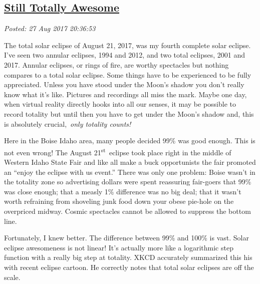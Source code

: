 %

\subsection*{\href{http://analyzethedatanotthedrivel.org/2017/08/27/still-totally-awesome/}{Still Totally Awesome}}


\noindent\emph{Posted: 27 Aug 2017 20:36:53}
\vspace{6pt}

The total solar eclipse of August 21, 2017, was my fourth complete solar
eclipse. I've seen two annular eclipses, 1994 and 2012, and two total
eclipses, 2001 and 2017. Annular eclipses, or rings of fire, are worthy
spectacles but nothing compares to a total solar eclipse. Some things
have to be experienced to be fully appreciated. Unless you have stood
under the Moon's shadow you don't really know what it's like. Pictures
and recordings all miss the mark. Maybe one day, when virtual reality
directly hooks into all our senses, it may be possible to record
totality but until then you have to get under the Moon's shadow and,
this is absolutely crucial,~\emph{only totality counts!}

Here in the Boise Idaho area, many people decided 99\% was good enough.
This is not even wrong! The August 21\textsuperscript{st}~eclipse took
place right in the middle of Western Idaho State Fair and like all make
a buck opportunists the fair promoted an ``enjoy the eclipse with us
event.'' There was only one problem: Boise wasn't in the totality zone
so advertising dollars were spent reassuring fair-goers that 99\% was
close enough; that a measly 1\% difference was no big deal; that it
wasn't worth refraining from shoveling junk food down your obese
pie-hole on the overpriced midway. Cosmic spectacles cannot be allowed
to suppress the bottom line.

Fortunately, I knew better. The difference between 99\% and 100\% is
vast. Solar eclipse awesomeness is not linear! It's actually more like a
logarithmic step function with a really big step at totality. XKCD
accurately summarized this his with recent eclipse cartoon. He correctly
notes that total solar eclipses are off the scale.



